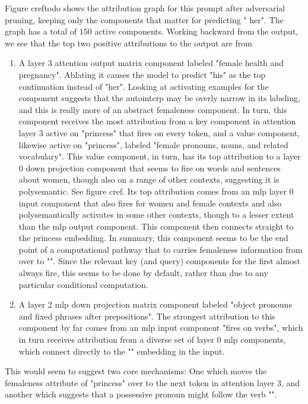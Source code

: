 \documentclass{article}
\begin{document}
Figure creftodo shows the attribution graph for this prompt after adversarial pruning, keeping only the components that matter for predicting " her". The graph has a total of $150$ active components. Working backward from the output, we see that the top two positive attributions to the output are from
\begin{enumerate}
\item{A layer 3 attention output matrix component labeled "female health and pregnancy". Ablating it causes the model to predict "his" as the top continuation instead of "her". Looking at activating examples for the component suggests that the autointerp may be overly narrow in its labeling, and this is really more of an abstract femaleness component. In turn, this component receives the most attribution from a key component in attention layer 3 active on "princess" that fires on every token, and a value component, likewise active on "princess", labeled "female pronouns, nouns, and related vocabulary". This value component, in turn, has its top attribution to a layer 0 down projection component that seems to fire on words and sentences about women, though also on a range of other contexts, suggesting it is polysemantic. See figure cref. Its top attribution comes from an mlp layer 0 input component that also fires for women and female contexts and also polysemantically activates in some other contexts, though to a lesser extent than the mlp output component. This component then connects straight to the princess embedding. In summary, this component seems to be the end point of a computational pathway that to carries femaleness information from  over to "". Since the relevant key (and query) components for the first almost always fire, this seems to be done by default, rather than due to any particular conditional computation.}
\item{A layer 2 mlp down projection matrix component labeled "object pronouns and fixed phrases after prepositions". The strongest attribution to this component by far comes from an mlp input component "fires on verbs", which in turn receives attribution from a diverse set of layer 0 mlp components, which connect directly to the "" embedding in the input.}
\end{enumerate}
This would seem to suggest two core mechanisms: One which moves the femaleness attribute of "princess" over to the next token in attention layer 3, and another which suggests that a possessive pronoun might follow the verb "". 
\end{document}
